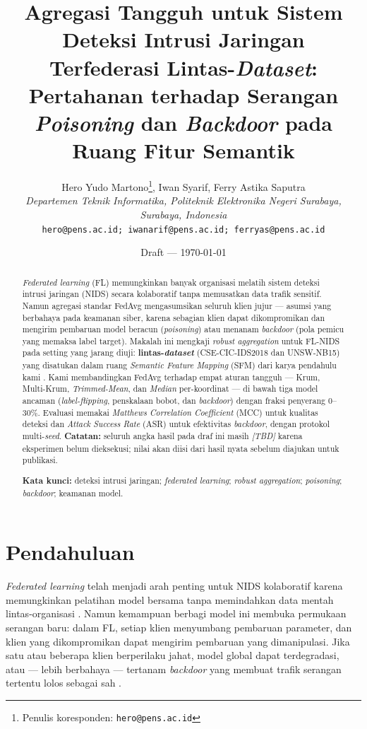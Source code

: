 \documentclass[11pt,a4paper]{article}
\title{\textbf{Agregasi Tangguh untuk Sistem Deteksi Intrusi Jaringan Terfederasi
Lintas-\emph{Dataset}: Pertahanan terhadap Serangan \emph{Poisoning} dan
\emph{Backdoor} pada Ruang Fitur Semantik}}
\author{Hero Yudo Martono\thanks{Penulis koresponden: \texttt{hero@pens.ac.id}},
\quad Iwan Syarif, \quad Ferry Astika Saputra \\[0.3em]
\textit{Departemen Teknik Informatika, Politeknik Elektronika Negeri Surabaya,
Surabaya, Indonesia} \\
\texttt{hero@pens.ac.id; iwanarif@pens.ac.id; ferryas@pens.ac.id}}
\date{Draft --- \today}
\newcommand{\TBD}{\textit{[TBD]}}
\begin{document}
\maketitle

\begin{abstract}
\emph{Federated learning} (FL) memungkinkan banyak organisasi melatih sistem
deteksi intrusi jaringan (NIDS) secara kolaboratif tanpa memusatkan data trafik
sensitif. Namun agregasi standar FedAvg mengasumsikan seluruh klien jujur ---
asumsi yang berbahaya pada keamanan siber, karena sebagian klien dapat
dikompromikan dan mengirim pembaruan model beracun (\emph{poisoning}) atau menanam
\emph{backdoor} (pola pemicu yang memaksa label target). Makalah ini mengkaji
\emph{robust aggregation} untuk FL-NIDS pada setting yang jarang diuji:
\textbf{lintas-\emph{dataset}} (CSE-CIC-IDS2018 dan UNSW-NB15) yang disatukan dalam
ruang \emph{Semantic Feature Mapping} (SFM) dari karya pendahulu kami \cite{sfm}.
Kami membandingkan FedAvg terhadap empat aturan tangguh --- Krum, Multi-Krum,
\emph{Trimmed-Mean}, dan \emph{Median} per-koordinat --- di bawah tiga model
ancaman (\emph{label-flipping}, penskalaan bobot, dan \emph{backdoor}) dengan
fraksi penyerang 0--30\%. Evaluasi memakai \emph{Matthews Correlation Coefficient}
(MCC) untuk kualitas deteksi dan \emph{Attack Success Rate} (ASR) untuk efektivitas
\emph{backdoor}, dengan protokol multi-\emph{seed}. \textbf{Catatan:} seluruh angka
hasil pada draf ini masih \TBD{} karena eksperimen belum dieksekusi; nilai akan
diisi dari hasil nyata sebelum diajukan untuk publikasi.

\medskip
\noindent\textbf{Kata kunci:} deteksi intrusi jaringan; \emph{federated learning};
\emph{robust aggregation}; \emph{poisoning}; \emph{backdoor}; keamanan model.
\end{abstract}

\section{Pendahuluan}
\label{sec:intro}

\emph{Federated learning} telah menjadi arah penting untuk NIDS kolaboratif karena
memungkinkan pelatihan model bersama tanpa memindahkan data mentah lintas-organisasi
\cite{popoola,fsurvey1}. Namun kemampuan berbagi model ini membuka permukaan
serangan baru: dalam FL, setiap klien menyumbang pembaruan parameter, dan klien
yang dikompromikan dapat mengirim pembaruan yang dimanipulasi. Jika satu atau
beberapa klien berperilaku jahat, model global dapat terdegradasi, atau --- lebih
berbahaya --- tertanam \emph{backdoor} yang membuat trafik serangan tertentu lolos
sebagai sah \cite{fbackdoor,fbagdasaryan}.
\end{document}
